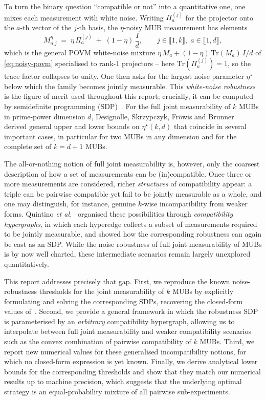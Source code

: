 \documentclass[oneside, a4paper, onecolumn, 11pt]{article}
\theoremstyle{definition}
\theoremstyle{plain}
\theoremstyle{remark}
\begin{document}
To turn the binary question ``compatible or not'' into a quantitative one, one
mixes each measurement with white noise. Writing $\Pi^{(j)}_a$ for the projector
onto the $a$-th vector of the $j$-th basis, the $\eta$-noisy MUB measurement has
elements
\begin{equation}
  M^{\eta}_{a|j} \;=\; \eta\,\Pi^{(j)}_a \;+\; (1-\eta)\,\frac{I}{d},
  \qquad j \in \llbracket 1, k \rrbracket,\; a \in \llbracket 1, d \rrbracket,
\end{equation}
which is the general POVM white-noise mixture
$\eta\,M_a + (1-\eta)\,\mathrm{Tr}(M_a)\,I/d$ of \eqref{eq:noisy-povm}
specialised to rank-1 projectors -- here $\mathrm{Tr}(\Pi^{(j)}_a) = 1$,
so the trace factor collapses to unity. One then asks for the largest
noise parameter $\eta^\star$ below which the family becomes jointly
measurable. This \emph{white-noise robustness} is the figure of
merit used throughout this report; crucially, it can be computed by semidefinite
programming (SDP)~\cite{Designolle2019,Guhne2023}. For the full joint
measurability of $k$ MUBs in prime-power dimension $d$, Designolle, Skrzypczyk,
Fröwis and Brunner~\cite{Designolle2019} derived general upper and lower bounds
on $\eta^\star(k,d)$ that coincide in several important cases, in particular for
two MUBs in any dimension and for the complete set of $k = d+1$ MUBs.
 
The all-or-nothing notion of full joint measurability is, however, only the
coarsest description of how a set of measurements can be (in)compatible. Once
three or more measurements are considered, richer \emph{structures} of
compatibility appear: a triple can be pairwise compatible yet fail to be jointly
measurable as a whole, and one may distinguish, for instance, genuine $k$-wise
incompatibility from weaker forms. Quintino \emph{et al.}~\cite{Quintino2019}
organised these possibilities through \emph{compatibility hypergraphs}, in which
each hyperedge collects a subset of measurements required to be jointly
measurable, and showed how the corresponding robustness can again be cast as an
SDP. While the noise robustness of full joint measurability of MUBs is by now
well charted, these intermediate scenarios remain largely unexplored
quantitatively.
 
This report addresses precisely that gap.
First, we reproduce the known noise-robustness thresholds for the joint
measurability of $k$ MUBs by explicitly formulating and solving the
corresponding SDPs, recovering the closed-form values
of~\cite{Designolle2019}. Second, we provide a general framework in which the
robustness SDP is parameterised by an \emph{arbitrary} compatibility hypergraph,
allowing us to interpolate between full joint measurability and weaker
compatibility scenarios such as the convex combination of pairwise compatibility of $k$ MUBs.
Third, we report new numerical values for these generalised incompatibility
notions, for which no closed-form expression is yet known. Finally, we derive
analytical lower bounds for the corresponding thresholds and show that they
match our numerical results up to machine precision, which suggests that the
underlying optimal strategy is an equal-probability mixture of all pairwise
sub-experiments.
 
\end{document}
